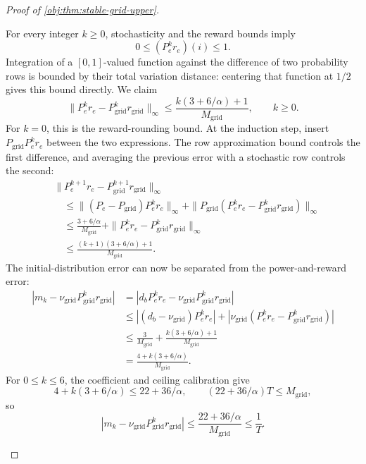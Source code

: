 \documentclass[11pt]{article}
\begin{document}
\begin{proof}[Proof of \cref{obj:thm:stable-grid-upper}]
\begin{enumerate}
For every integer \(k\ge0\), stochasticity and the reward bounds imply
\[
0\le(P_e^kr_e)(i)\le1.
\]
Integration of a \([0,1]\)-valued function against the difference of two probability rows is bounded by their total variation distance: centering that function at \(1/2\) gives this bound directly. We claim
\[
\|P_e^kr_e-P_{\mathrm{grid}}^kr_{\mathrm{grid}}\|_\infty
\le
\frac{k(3+6/\alpha)+1}{M_{\mathrm{grid}}},
\qquad k\ge0.
\]
For \(k=0\), this is the reward-rounding bound. At the induction step, insert
\(P_{\mathrm{grid}}P_e^kr_e\) between the two expressions. The row approximation bound controls the first difference, and averaging the previous error with a stochastic row controls the second:
\[
\begin{aligned}
&\|P_e^{k+1}r_e-P_{\mathrm{grid}}^{k+1}r_{\mathrm{grid}}\|_\infty\\
&\quad\le
\|(P_e-P_{\mathrm{grid}})P_e^kr_e\|_\infty
+
\|P_{\mathrm{grid}}
 (P_e^kr_e-P_{\mathrm{grid}}^kr_{\mathrm{grid}})\|_\infty\\
&\quad\le
\frac{3+6/\alpha}{M_{\mathrm{grid}}}
+
\|P_e^kr_e-P_{\mathrm{grid}}^kr_{\mathrm{grid}}\|_\infty\\
&\quad\le
\frac{(k+1)(3+6/\alpha)+1}{M_{\mathrm{grid}}}.
\end{aligned}
\]
The initial-distribution error can now be separated from the power-and-reward error:
\[
\begin{aligned}
|m_k-\nu_{\mathrm{grid}}P_{\mathrm{grid}}^kr_{\mathrm{grid}}|
&=
|d_bP_e^kr_e-\nu_{\mathrm{grid}}P_{\mathrm{grid}}^kr_{\mathrm{grid}}|\\
&\le
|(d_b-\nu_{\mathrm{grid}})P_e^kr_e|
+
|\nu_{\mathrm{grid}}
 (P_e^kr_e-P_{\mathrm{grid}}^kr_{\mathrm{grid}})|\\
&\le
\frac3{M_{\mathrm{grid}}}
+
\frac{k(3+6/\alpha)+1}{M_{\mathrm{grid}}}\\
&=
\frac{4+k(3+6/\alpha)}{M_{\mathrm{grid}}}.
\end{aligned}
\]
For \(0\le k\le6\), the coefficient and ceiling calibration give
\[
4+k(3+6/\alpha)\le22+36/\alpha,
\qquad
(22+36/\alpha)T\le M_{\mathrm{grid}},
\]
so
\[
|m_k-\nu_{\mathrm{grid}}P_{\mathrm{grid}}^kr_{\mathrm{grid}}|
\le
\frac{22+36/\alpha}{M_{\mathrm{grid}}}
\le\frac1T.
\]


\end{enumerate}
\end{proof}
\end{document}

